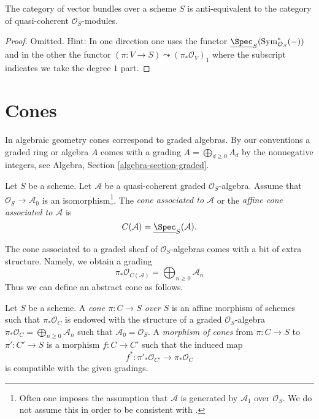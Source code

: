 \begin{lemma}
\label{lemma-category-vector-bundles}
The category of vector bundles over a scheme $S$ is
anti-equivalent to the category of quasi-coherent $\mathcal{O}_S$-modules.
\end{lemma}

\begin{proof}
Omitted. Hint: In one direction one uses the functor
$\underline{\Spec}_S(\text{Sym}^*_{\mathcal{O}_S}(-))$
and in the other the functor
$(\pi : V \to S) \leadsto (\pi_*\mathcal{O}_V)_1$ where the subscript
indicates we take the degree $1$ part.
\end{proof}




\section{Cones}
\label{section-cone}

\noindent
In algebraic geometry cones correspond to graded algebras. By our conventions
a graded ring or algebra $A$ comes with a grading
$A = \bigoplus_{d \geq 0} A_d$ by the nonnegative integers, see
Algebra, Section \ref{algebra-section-graded}.

\begin{definition}
\label{definition-cone}
Let $S$ be a scheme. Let $\mathcal{A}$ be a quasi-coherent
graded $\mathcal{O}_S$-algebra. Assume that $\mathcal{O}_S \to \mathcal{A}_0$
is an isomorphism\footnote{Often one imposes the assumption that
$\mathcal{A}$ is generated by $\mathcal{A}_1$ over $\mathcal{O}_S$. We do not
assume this in order to be consistent with \cite[II, (8.3.1)]{EGA}.}.
The {\it cone associated to $\mathcal{A}$} or the
{\it affine cone associated to $\mathcal{A}$}
is
$$
C(\mathcal{A}) = \underline{\Spec}_S(\mathcal{A}).
$$
\end{definition}

\noindent
The cone associated to a graded sheaf of $\mathcal{O}_S$-algebras
comes with a bit of extra structure. Namely, we obtain a grading
$$
\pi_*\mathcal{O}_{C(\mathcal{A})} =
\bigoplus\nolimits_{n \geq 0} \mathcal{A}_n
$$
Thus we can define an abstract cone as follows.

\begin{definition}
\label{definition-abstract-cone}
Let $S$ be a scheme. A {\it cone $\pi : C \to S$ over $S$} is an
affine morphism of schemes such that $\pi_*\mathcal{O}_C$ is endowed with
the structure of a graded $\mathcal{O}_S$-algebra
$\pi_*\mathcal{O}_C = \bigoplus\nolimits_{n \geq 0} \mathcal{A}_n$
such that $\mathcal{A}_0 = \mathcal{O}_S$. A {\it morphism of cones}
from $\pi : C \to S$ to $\pi' : C' \to S$
is a morphism $f : C \to C'$ such that the induced map
$$
f^* : \pi'_*\mathcal{O}_{C'} \longrightarrow \pi_*\mathcal{O}_C
$$
is compatible with the given gradings.
\end{definition}

